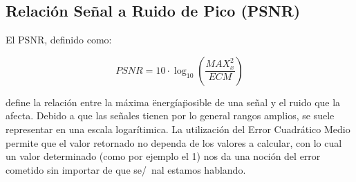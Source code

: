 \subsection {Relación Señal a Ruido de Pico (PSNR)}

El PSNR, definido como:

$$
\mathit{PSNR} = 10 \cdot \log_{10} \left( \frac{\mathit{MAX}^2_x}{\mathit{ECM}}
\right)
$$

define la relaci\'on entre la m\'axima \"energ\'ia\" posible de una se\~nal y el
ruido que la afecta. Debido a que las se\~nales tienen por lo general rangos
amplios, se suele representar en una escala logar\'itimica. La utilizaci\'on del
 Error Cuadr\'atico Medio permite que el valor retornado no dependa de los
valores a calcular, con lo cual un valor determinado (como por ejemplo el 1) nos
da una noci\'on del error cometido sin importar de que se/~nal estamos hablando.
